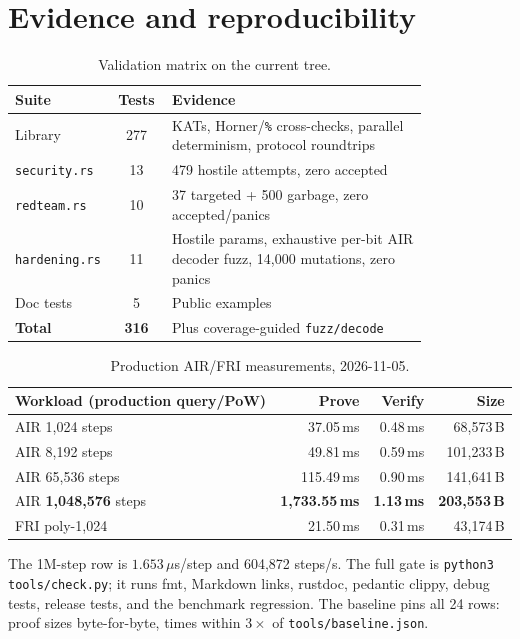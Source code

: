 \documentclass[11pt,a4paper]{article}
\begin{document}
\section{Evidence and reproducibility}

\begin{table}[h]
\centering
\small
\begin{tabular}{@{}L{0.20\linewidth}cL{0.62\linewidth}@{}}
\toprule
Suite & Tests & Evidence \\
\midrule
Library & 277 & KATs, Horner/\texttt{\%} cross-checks, parallel determinism, protocol roundtrips \\
\texttt{security.rs} & 13 & 479 hostile attempts, zero accepted \\
\texttt{redteam.rs} & 10 & 37 targeted + 500 garbage, zero accepted/panics \\
\texttt{hardening.rs} & 11 & Hostile params, exhaustive per-bit AIR decoder fuzz, 14,000 mutations, zero panics \\
Doc tests & 5 & Public examples \\
\textbf{Total} & \textbf{316} & Plus coverage-guided \texttt{fuzz/decode} \\
\bottomrule
\end{tabular}
\caption{Validation matrix on the current tree.}
\end{table}

\begin{table}[h]
\centering
\small
\begin{tabular}{@{}lrrr@{}}
\toprule
Workload (production query/PoW) & Prove & Verify & Size \\
\midrule
AIR 1,024 steps & 37.05\,ms & 0.48\,ms & 68,573\,B \\
AIR 8,192 steps & 49.81\,ms & 0.59\,ms & 101,233\,B \\
AIR 65,536 steps & 115.49\,ms & 0.90\,ms & 141,641\,B \\
AIR \textbf{1,048,576} steps & \textbf{1,733.55\,ms} & \textbf{1.13\,ms} & \textbf{203,553\,B} \\
FRI poly-1,024 & 21.50\,ms & 0.31\,ms & 43,174\,B \\
\bottomrule
\end{tabular}
\caption{Production AIR/FRI measurements, 2026-11-05.}
\end{table}

The 1M-step row is $1.653\,\mu$s/step and 604,872 steps/s. The full gate is
\texttt{python3 tools/check.py}; it runs fmt, Markdown links, rustdoc,
pedantic clippy, debug tests, release tests, and the benchmark regression.
The baseline pins all 24 rows: proof sizes byte-for-byte, times within
$3\times$ of \texttt{tools/baseline.json}.
\end{document}
